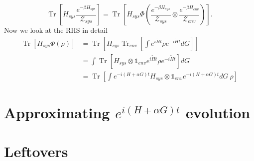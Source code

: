 \documentclass{article}
\newcommand{\parens}[1]{\left( #1 \right)}
\newcommand{\brackets}[1]{\left[ #1 \right]}
\newcommand{\openone}{\mathds{1}}
\DeclareMathOperator{\Tr}{Tr}
\newcommand{\trace}[1]{\Tr \brackets{ #1 }}
\newcommand{\partrace}[2]{\Tr_{#1} \brackets{ #2 }}
\newcommand{\partfun}{\mathcal{Z}}
\begin{document}
\begin{equation}
    \trace{H_{sys} \frac{e^{-\beta H_{sys}}}{\partfun_{sys}}} = \trace{H_{sys} \Phi \parens{\frac{e^{-\beta H_{sys}}}{\partfun_{sys}} \otimes \frac{e^{- \beta H_{env}}}{\partfun_{env}}}}.
\end{equation}
Now we look at the RHS in detail
\begin{align}
    \trace{H_{sys} \Phi \parens{\rho} } &= \trace{ H_{sys} \partrace{env}{\int e^{i \widetilde{H} t} \rho e^{-i \widetilde{H} t} dG}} \\
    &= \int \trace{H_{sys} \otimes \openone_{env} e^{i \widetilde{H} t} \rho e^{-i \widetilde{H} t} } dG \\
    &=  \trace{\int e^{- i (H + \alpha G) t} H_{sys} \otimes \openone_{env} e^{+ i (H + \alpha G) t} dG ~ \rho } 
\end{align}





\section{Approximating $e^{i (H + \alpha G) t}$ evolution}


\section{Leftovers}
\end{document}
